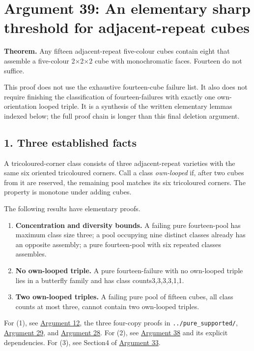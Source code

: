 \documentclass[
  10pt,
]{article}
\providecommand{\tightlist}{%
  \setlength{\itemsep}{0pt}\setlength{\parskip}{0pt}}
\begin{document}
\hypertarget{arg-39}{%
\section{Argument 39: An elementary sharp threshold for adjacent-repeat
cubes}\label{arg-39}}

\textbf{Theorem.} Any fifteen adjacent-repeat five-colour cubes contain
eight that assemble a five-colour 2×2×2 cube with monochromatic faces.
Fourteen do not suffice.

This proof does not use the exhaustive fourteen-cube failure list. It
also does not require finishing the classification of fourteen-failures
with exactly one own-orientation looped triple. It is a synthesis of the
written elementary lemmas indexed below; the full proof chain is longer
than this final deletion argument.

\hypertarget{three-established-facts}{%
\subsection*{1. Three established facts}\label{three-established-facts}}

A tricoloured-corner class consists of three adjacent-repeat varieties
with the same six oriented tricoloured corners. Call a class
\emph{own-looped} if, after two cubes from it are reserved, the
remaining pool matches its six tricoloured corners. The property is
monotone under adding cubes.

The following results have elementary proofs.

\begin{enumerate}
\def\labelenumi{\arabic{enumi}.}
\tightlist
\item
  \textbf{Concentration and diversity bounds.} A failing pure
  fourteen-pool has maximum class size three; a pool occupying nine
  distinct classes already has an opposite assembly; a pure
  fourteen-pool with six repeated classes assembles.
\item
  \textbf{No own-looped triple.} A pure fourteen-failure with no
  own-looped triple lies in a butterfly family and has class
  counts3,3,3,3,1,1.
\item
  \textbf{Two own-looped triples.} A failing pure pool of fifteen cubes,
  all class counts at most three, cannot contain two own-looped triples.
\end{enumerate}

For (1), see \protect\hyperlink{arg-12}{Argument 12}, the three
four-copy proofs in \texttt{../pure\_supported/},
\protect\hyperlink{arg-29}{Argument 29}, and
\protect\hyperlink{arg-28}{Argument 28}. For (2), see
\protect\hyperlink{arg-38}{Argument 38} and its explicit dependencies.
For (3), see Section4 of \protect\hyperlink{arg-33}{Argument 33}.
\end{document}
